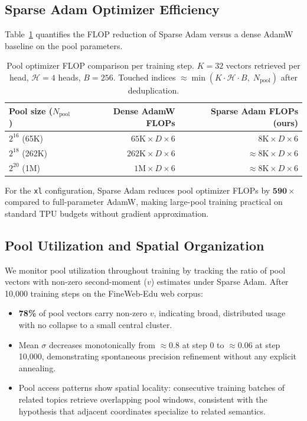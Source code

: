 \documentclass[11pt]{article}
\begin{document}
\subsection{Sparse Adam Optimizer Efficiency}

Table~\ref{tab:sparseadam} quantifies the FLOP reduction of Sparse Adam
versus a dense AdamW baseline on the pool parameters.

\begin{table}[ht]
\centering
\caption{
  Pool optimizer FLOP comparison per training step.
  $K=32$ vectors retrieved per head, $\mathcal{H}=4$ heads, $B=256$.
  Touched indices $\approx \min(K \cdot \mathcal{H} \cdot B,\; N_{\text{pool}})$
  after deduplication.
}
\label{tab:sparseadam}
\setlength{\tabcolsep}{6pt}
\begin{tabular}{lrr}
\toprule
Pool size ($N_{\text{pool}}$) & Dense AdamW FLOPs & Sparse Adam FLOPs (ours) \\
\midrule
$2^{16}$ (65K)  & $65\text{K} \times D \times 6$  & $8\text{K} \times D \times 6$ \\
$2^{18}$ (262K) & $262\text{K} \times D \times 6$ & $\approx 8\text{K} \times D \times 6$ \\
$2^{20}$ (1M)   & $1\text{M} \times D \times 6$   & $\approx 8\text{K} \times D \times 6$ \\
\bottomrule
\end{tabular}
\end{table}

\noindent For the \texttt{xl} configuration, Sparse Adam reduces pool optimizer
FLOPs by $\mathbf{590\times}$ compared to full-parameter AdamW, making
large-pool training practical on standard TPU budgets without gradient
approximation.

\subsection{Pool Utilization and Spatial Organization}

We monitor pool utilization throughout training by tracking the ratio of pool
vectors with non-zero second-moment ($v$) estimates under Sparse Adam.
After 10,000 training steps on the FineWeb-Edu web corpus:

\begin{itemize}[leftmargin=1.8em]
  \item \textbf{78\%} of pool vectors carry non-zero $v$, indicating broad,
        distributed usage with no collapse to a small central cluster.
  \item Mean $\sigma$ decreases monotonically from $\approx 0.8$ at step 0
        to $\approx 0.06$ at step 10,000, demonstrating spontaneous precision
        refinement without any explicit annealing.
  \item Pool access patterns show spatial locality: consecutive training
        batches of related topics retrieve overlapping pool windows,
        consistent with the hypothesis that adjacent coordinates specialize
        to related semantics.
\end{itemize}
\end{document}
